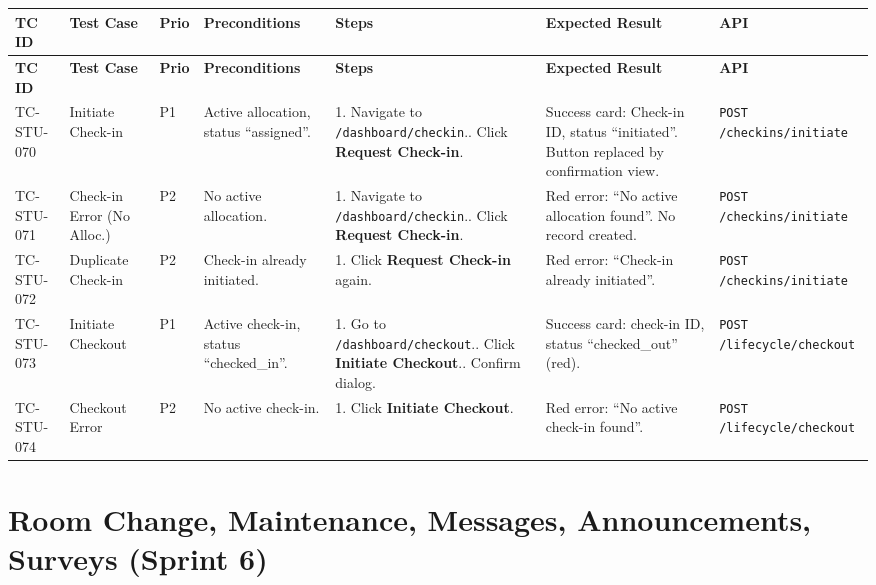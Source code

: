 \documentclass[12pt,a4paper]{article}
\begin{document}
\begin{longtable}{L{2cm} L{3cm} L{1cm} L{4cm} L{5.5cm} L{5.5cm} L{3cm}}
\toprule
\textbf{TC ID} & \textbf{Test Case} & \textbf{Prio} & \textbf{Preconditions} & \textbf{Steps} & \textbf{Expected Result} & \textbf{API} \\
\midrule
\endfirsthead
\toprule
\textbf{TC ID} & \textbf{Test Case} & \textbf{Prio} & \textbf{Preconditions} & \textbf{Steps} & \textbf{Expected Result} & \textbf{API} \\
\midrule
\endhead
\bottomrule
\endfoot

TC-STU-070
& Initiate Check-in
& P1
& Active allocation, status ``assigned''.
& 1. Navigate to \texttt{/dashboard/checkin}.. Click \textbf{Request Check-in}.
& Success card: Check-in ID, status ``initiated''. Button replaced by confirmation view.
& \texttt{POST /checkins/initiate}
\\
\midrule

TC-STU-071
& Check-in Error (No Alloc.)
& P2
& No active allocation.
& 1. Navigate to \texttt{/dashboard/checkin}.. Click \textbf{Request Check-in}.
& Red error: ``No active allocation found''. No record created.
& \texttt{POST /checkins/initiate}
\\
\midrule

TC-STU-072
& Duplicate Check-in
& P2
& Check-in already initiated.
& 1. Click \textbf{Request Check-in} again.
& Red error: ``Check-in already initiated''.
& \texttt{POST /checkins/initiate}
\\
\midrule

TC-STU-073
& Initiate Checkout
& P1
& Active check-in, status ``checked\_in''.
& 1. Go to \texttt{/dashboard/checkout}.. Click \textbf{Initiate Checkout}.. Confirm dialog.
& Success card: check-in ID, status ``checked\_out'' (red).
& \texttt{POST /lifecycle/checkout}
\\
\midrule

TC-STU-074
& Checkout Error
& P2
& No active check-in.
& 1. Click \textbf{Initiate Checkout}.
& Red error: ``No active check-in found''.
& \texttt{POST /lifecycle/checkout}
\\

\end{longtable}


\section{Room Change, Maintenance, Messages, Announcements, Surveys (Sprint 6)}
\end{document}

